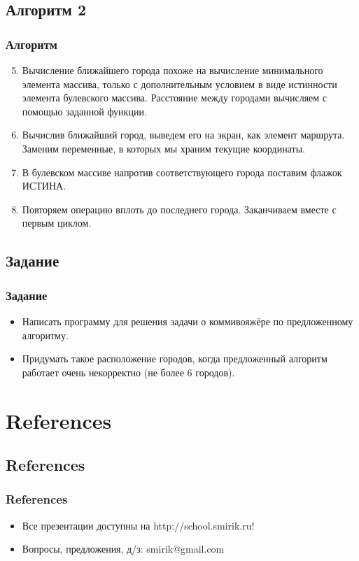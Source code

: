 \documentclass[compress,red]{beamer}
\begin{document}
\subsection{Алгоритм 2}
\begin{frame}[fragile]
  \frametitle{Алгоритм}
	\begin{enumerate}
		\setcounter{enumi}{4}
		\item Вычисление ближайшего города похоже на вычисление минимального элемента массива, только с дополнительным условием в виде истинности элемента булевского массива. Расстояние между городами вычисляем с помощью заданной функции.
		\item Вычислив ближайший город, выведем его на экран, как элемент маршрута. Заменим переменные, в которых мы храним текущие координаты.
		\item В булевском массиве напротив соответствующего города поставим флажок ИСТИНА.
		\item Повторяем операцию вплоть до последнего города. Заканчиваем вместе с первым циклом.
 	\end{enumerate}
\end{frame}

\subsection{Задание}
\begin{frame}[fragile]
  \frametitle{Задание}
	\begin{itemize}
		\item Написать программу для решения задачи о коммивояжёре по предложенному алгоритму.
		\item Придумать такое расположение городов, когда предложенный алгоритм работает очень некорректно (не более 6 городов).
	\end{itemize}
\end{frame}

\section{References}
\subsection{References}
\begin{frame}[fragile]
  \frametitle{References}
  \begin{itemize}
    \item Все презентации доступны на http://school.smirik.ru!
    \item Вопросы, предложения, д/з: smirik@gmail.com
  \end{itemize}
\end{frame}
\end{document}
